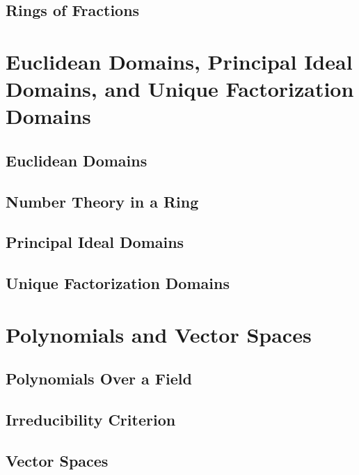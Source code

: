 \documentclass[a4paper, openany]{book}
\begin{document}
\section{Rings of Fractions}

\newpage

\chapter{Euclidean Domains, Principal Ideal Domains, and Unique Factorization Domains}
\section{Euclidean Domains}

\newpage

\section{Number Theory in a Ring}

\newpage

\section{Principal Ideal Domains}

\newpage

\section{Unique Factorization Domains}

\newpage

\chapter{Polynomials and Vector Spaces}
\section{Polynomials Over a Field}

\newpage

\section{Irreducibility Criterion}

\newpage

\section{Vector Spaces}

\newpage
\end{document}
